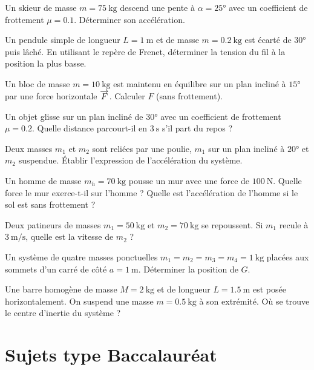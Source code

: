 \exo{} Un skieur de masse $m=\SI{75}{\kilogram}$ descend une pente à $\alpha=\ang{25}$ avec un coefficient de frottement $\mu=0.1$. Déterminer son accélération.

\exo{} Un pendule simple de longueur $L=\SI{1}{\metre}$ et de masse $m=\SI{0.2}{\kilogram}$ est écarté de $\ang{30}$ puis lâché. En utilisant le repère de Frenet, déterminer la tension du fil à la position la plus basse.


\exo{} Un bloc de masse $m=\SI{10}{\kilogram}$ est maintenu en équilibre sur un plan incliné à $\ang{15}$ par une force horizontale $\overrightarrow{F}$. Calculer $F$ (sans frottement).

\exo{} Un objet glisse sur un plan incliné de $\ang{30}$ avec un coefficient de frottement $\mu=0.2$. Quelle distance parcourt-il en $\SI{3}{\second}$ s’il part du repos ?

\exo{} Deux masses $m_1$ et $m_2$ sont reliées par une poulie, $m_1$ sur un plan incliné à $\ang{20}$ et $m_2$ suspendue. Établir l’expression de l’accélération du système.


\exo{} Un homme de masse $m_h=\SI{70}{\kilogram}$ pousse un mur avec une force de $\SI{100}{\newton}$. Quelle force le mur exerce-t-il sur l’homme ? Quelle est l’accélération de l’homme si le sol est sans frottement ?

\exo{} Deux patineurs de masses $m_1=\SI{50}{\kilogram}$ et $m_2=\SI{70}{\kilogram}$ se repoussent. Si $m_1$ recule à $\SI{3}{\metre\per\second}$, quelle est la vitesse de $m_2$ ?


\exo{} Un système de quatre masses ponctuelles $m_1=m_2=m_3=m_4=\SI{1}{\kilogram}$ placées aux sommets d’un carré de côté $a=\SI{1}{\metre}$. Déterminer la position de $G$.

\exo{} Une barre homogène de masse $M=\SI{2}{\kilogram}$ et de longueur $L=\SI{1.5}{\metre}$ est posée horizontalement. On suspend une masse $m=\SI{0.5}{\kilogram}$ à son extrémité. Où se trouve le centre d’inertie du système ?

\section{Sujets type Baccalauréat}

